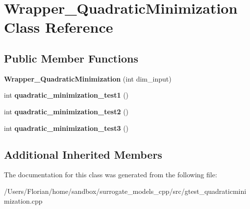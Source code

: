 \hypertarget{class_wrapper___quadratic_minimization}{}\section{Wrapper\+\_\+\+Quadratic\+Minimization Class Reference}
\label{class_wrapper___quadratic_minimization}
\subsection*{Public Member Functions}
\begin{DoxyCompactItemize}
\item 
{\bfseries Wrapper\+\_\+\+Quadratic\+Minimization} (int dim\+\_\+input)\hypertarget{class_wrapper___quadratic_minimization_a1679b222c1f1d17831deeb599d23024a}{}\label{class_wrapper___quadratic_minimization_a1679b222c1f1d17831deeb599d23024a}

\item 
int {\bfseries quadratic\+\_\+minimization\+\_\+test1} ()\hypertarget{class_wrapper___quadratic_minimization_a0fbf9085caecf923fa48002ab5c5e2d1}{}\label{class_wrapper___quadratic_minimization_a0fbf9085caecf923fa48002ab5c5e2d1}

\item 
int {\bfseries quadratic\+\_\+minimization\+\_\+test2} ()\hypertarget{class_wrapper___quadratic_minimization_a32221f4aff3169ec42386caf2f888962}{}\label{class_wrapper___quadratic_minimization_a32221f4aff3169ec42386caf2f888962}

\item 
int {\bfseries quadratic\+\_\+minimization\+\_\+test3} ()\hypertarget{class_wrapper___quadratic_minimization_a4c0ffea92d148acd4921eb91883bf2e1}{}\label{class_wrapper___quadratic_minimization_a4c0ffea92d148acd4921eb91883bf2e1}

\end{DoxyCompactItemize}
\subsection*{Additional Inherited Members}


The documentation for this class was generated from the following file\+:\begin{DoxyCompactItemize}
\item 
/\+Users/\+Florian/home/sandbox/surrogate\+\_\+models\+\_\+cpp/src/gtest\+\_\+quadraticminimization.\+cpp\end{DoxyCompactItemize}

